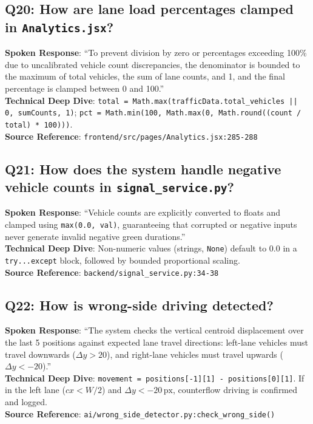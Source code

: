 \subsection*{Q20: How are lane load percentages clamped in \texttt{Analytics.jsx}?}
\begin{interviewbox}
\textbf{Spoken Response}: ``To prevent division by zero or percentages exceeding 100\% due to uncalibrated vehicle count discrepancies, the denominator is bounded to the maximum of total vehicles, the sum of lane counts, and 1, and the final percentage is clamped between 0 and 100.''\\
\textbf{Technical Deep Dive}: \texttt{total = Math.max(trafficData.total\_vehicles || 0, sumCounts, 1)}; \texttt{pct = Math.min(100, Math.max(0, Math.round((count / total) * 100)))}.\\
\textbf{Source Reference}: \texttt{frontend/src/pages/Analytics.jsx:285-288}
\end{interviewbox}

\subsection*{Q21: How does the system handle negative vehicle counts in \texttt{signal\_service.py}?}
\begin{interviewbox}
\textbf{Spoken Response}: ``Vehicle counts are explicitly converted to floats and clamped using \texttt{max(0.0, val)}, guaranteeing that corrupted or negative inputs never generate invalid negative green durations.''\\
\textbf{Technical Deep Dive}: Non-numeric values (strings, \texttt{None}) default to 0.0 in a \texttt{try...except} block, followed by bounded proportional scaling.\\
\textbf{Source Reference}: \texttt{backend/signal\_service.py:34-38}
\end{interviewbox}

\subsection*{Q22: How is wrong-side driving detected?}
\begin{interviewbox}
\textbf{Spoken Response}: ``The system checks the vertical centroid displacement over the last 5 positions against expected lane travel directions: left-lane vehicles must travel downwards ($\Delta y > 20$), and right-lane vehicles must travel upwards ($\Delta y < -20$).''\\
\textbf{Technical Deep Dive}: \texttt{movement = positions[-1][1] - positions[0][1]}. If in the left lane ($cx < W/2$) and $\Delta y < -20\,\text{px}$, counterflow driving is confirmed and logged.\\
\textbf{Source Reference}: \texttt{ai/wrong\_side\_detector.py:check\_wrong\_side()}
\end{interviewbox}

